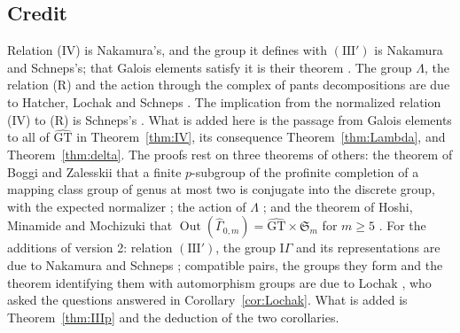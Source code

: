 \documentclass[11pt,a4paper]{article}
\theoremstyle{plain}
\theoremstyle{definition}
\theoremstyle{remark}
\newcommand{\GT}{\widehat{\mathrm{GT}}}
\newcommand{\Gh}{\widehat\Gamma}
\newcommand{\Out}{\operatorname{Out}}
\begin{document}
\subsection*{Credit}
Relation (IV) is Nakamura's, and the group it defines with $(\mathrm{III}')$ is Nakamura and Schneps's; that Galois
elements satisfy it is their theorem \cite[\S1]{NS}. The group $\Lambda$, the relation (R) and the action through
the complex of pants decompositions are due to Hatcher, Lochak and Schneps \cite{HLS}. The implication from the
normalized relation (IV) to (R) is Schneps's \cite[p.~670]{S}. What is added here is the passage from Galois
elements to all of $\GT$ in Theorem~\ref{thm:IV}, its consequence Theorem~\ref{thm:Lambda}, and
Theorem~\ref{thm:delta}. The proofs rest on three theorems of others: the theorem of Boggi and Zalesskii that a
finite $p$-subgroup of the profinite completion of a mapping class group of genus at most two is conjugate into the
discrete group, with the expected normalizer \cite{BZ}; the action of $\Lambda$ \cite{HLS}; and the theorem of
Hoshi, Minamide and Mochizuki that $\Out(\Gh_{0,m})=\GT\times\mathfrak S_m$ for $m\ge5$
\cite[Corollary C]{HMM}. For the additions of version 2: relation $(\mathrm{III}')$, the group $\mathrm{I}\Gamma$ and
its representations are due to Nakamura and Schneps \cite{NS}; compatible pairs, the groups they form and the
theorem identifying them with automorphism groups are due to Lochak \cite{Lo}, who asked the questions answered in
Corollary~\ref{cor:Lochak}. What is added is Theorem~\ref{thm:IIIp} and the deduction of the two corollaries.
\end{document}
